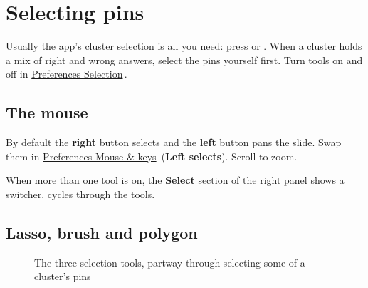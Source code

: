 \section{Selecting pins}\label{sec:selecting}

\label{sec:selecting:selecting-pins}

Usually the app's cluster selection is all you need: press  or . When a cluster holds a mix of right and wrong answers, select the pins yourself first. Turn tools on and off in \href{https://github.com/agadin/micro-speed-grader/blob/main/docs/help/preferences.md\#selection}{Preferences \menuarrow{} Selection}\,\onlinemark{}.

\subsection[The mouse\alsotoc{sec:selecting:lasso}{Lasso, brush and polygon}]{The mouse}\label{sec:selecting:the-mouse}

By default the \textbf{right} button selects and the \textbf{left} button pans the slide. Swap them in \href{https://github.com/agadin/micro-speed-grader/blob/main/docs/help/preferences.md\#mouse--keys}{Preferences \menuarrow{} Mouse \& keys}\,\onlinemark{} (\textbf{Left selects}). Scroll to zoom.

When more than one tool is on, the \textbf{Select} section of the right panel shows a switcher.  cycles through the tools.

\tocoff
\subsection{Lasso, brush and polygon}\label{sec:selecting:lasso}
\tocon\label{sec:selecting:brush}\label{sec:selecting:polygon}

\begin{figure}[H]\centering
{}\hfill
{}\hfill
{}
\caption{The three selection tools, partway through selecting some of a cluster's pins}\label{fig:tools}
\end{figure}

